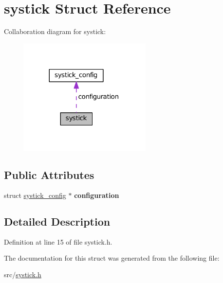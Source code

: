 \hypertarget{structsystick}{}\section{systick Struct Reference}
\label{structsystick}


Collaboration diagram for systick\+:\nopagebreak
\begin{figure}[H]
\begin{center}
\leavevmode
\includegraphics[width=188pt]{structsystick__coll__graph}
\end{center}
\end{figure}
\subsection*{Public Attributes}
\begin{DoxyCompactItemize}
\item 
\hypertarget{structsystick_a6e7d92e68eb2e575624d068b187ace33}{}struct \hyperlink{structsystick__config}{systick\+\_\+config} $\ast$ {\bfseries configuration}\label{structsystick_a6e7d92e68eb2e575624d068b187ace33}

\end{DoxyCompactItemize}


\subsection{Detailed Description}


Definition at line 15 of file systick.\+h.



The documentation for this struct was generated from the following file\+:\begin{DoxyCompactItemize}
\item 
src/\hyperlink{systick_8h}{systick.\+h}\end{DoxyCompactItemize}
